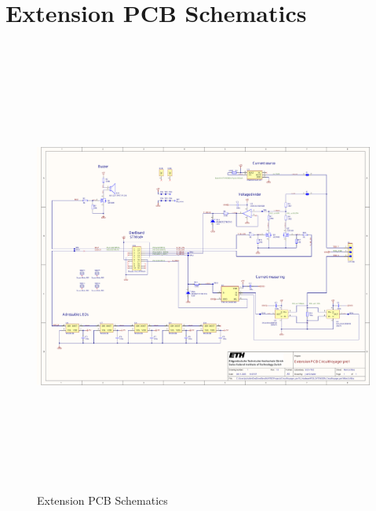 \section{Extension PCB Schematics}
\label{sec:Extension PCB Schematics}
\begin{figure}[H]
	\centering
	\includegraphics[height=15cm, angle=270]{../../../5_Hardware/PCB_EXTENSION_CircuitVoyager_pre1/Project Outputs for PCB_EXT_CV_PRE1/Schematic_PCB_EXTENSION_CircuitVoyager_pre1.pdf}
	\caption{Extension PCB Schematics}
	\label{fig:Extension PCB Schematics}
\end{figure}


